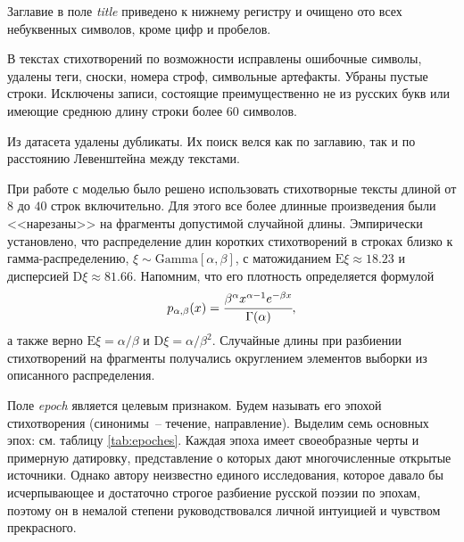 \documentclass[a4paper,12pt]{article}
\begin{document}
Заглавие в поле \textit{title} приведено к нижнему регистру и очищено ото всех небуквенных символов, кроме цифр и пробелов.

В текстах стихотворений по возможности исправлены ошибочные символы, удалены теги, сноски, номера строф, символьные артефакты. Убраны пустые строки. Исключены записи, состоящие преимущественно не из русских букв или имеющие среднюю длину строки более $60$ символов.

Из датасета удалены дубликаты. Их поиск велся как по заглавию, так и по расстоянию Левенштейна между текстами.

При работе с моделью было решено использовать стихотворные тексты длиной от $8$ до $40$ строк включительно. Для этого все более длинные произведения были <<нарезаны>> на фрагменты допустимой случайной длины. Эмпирически установлено, что распределение длин коротких стихотворений в строках близко к гамма-распределению, $\xi \sim \text{Gamma}[\alpha, \beta]$, с матожиданием $\text{E} \xi \approx 18.23$ и дисперсией $\text{D} \xi \approx 81.66$. Напомним, что его плотность определяется формулой
\[
    p_{\alpha, \beta}(x) = \cfrac{\beta^\alpha x^{\alpha - 1} e^{-\beta x}}{\Gamma(\alpha)},
\]
а также верно $\text{E} \xi = \alpha / \beta$ и $\text{D} \xi = \alpha / \beta^2$. Случайные длины при разбиении стихотворений на фрагменты получались округлением элементов выборки из описанного распределения.

Поле \textit{epoch} является целевым признаком. Будем называть его эпохой стихотворения (синонимы~-- течение, направление). Выделим семь основных эпох: см. таблицу \ref{tab:epoches}. Каждая эпоха имеет своеобразные черты и примерную датировку, представление о которых дают многочисленные открытые источники. Однако автору неизвестно единого исследования, которое давало бы исчерпывающее и достаточно строгое разбиение русской поэзии по эпохам, поэтому он в немалой степени руководствовался личной интуицией и чувством прекрасного.
\end{document}
